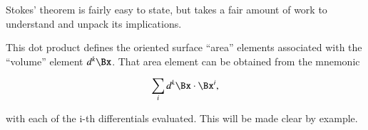 %
%
Stokes' theorem is fairly easy to state, but takes a fair amount of work to understand and unpack its implications.



This dot product defines the oriented surface ``area'' elements associated with the ``volume'' element \( d^k \Bx \).
That area element can be obtained from the mnemonic

\begin{dmath}\label{eqn:statement:1561}
\sum_i d^k \Bx \cdot \Bx^i,
\end{dmath}

with each of the i-th differentials evaluated.
This will be made clear by example.

